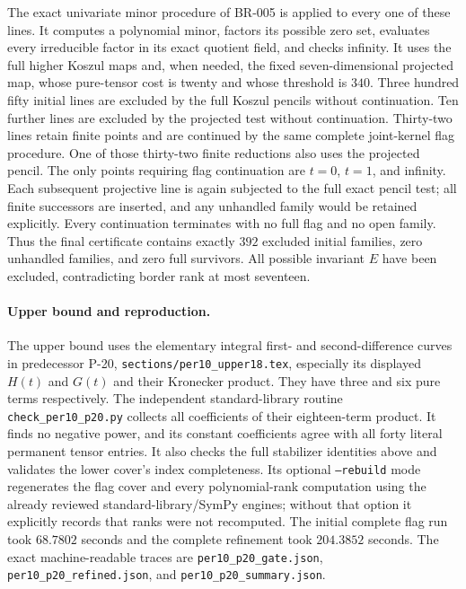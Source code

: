 The exact univariate minor procedure of BR-005 is applied to every
one of these lines.  It computes a polynomial minor, factors its
possible zero set, evaluates every irreducible factor in its exact
quotient field, and checks infinity.  It uses the full higher Koszul
maps and, when needed, the fixed seven-dimensional projected map,
whose pure-tensor cost is twenty and whose threshold is $340$.
Three hundred fifty initial lines are excluded by the full Koszul
pencils without continuation.  Ten further lines are excluded by
the projected test without continuation.  Thirty-two lines retain
finite points and are continued by the same complete joint-kernel
flag procedure.  One of those thirty-two finite reductions also
uses the projected pencil.  The only points requiring flag
continuation are $t=0$, $t=1$, and infinity.  Each subsequent
projective line is again subjected to the full exact pencil test;
all finite successors are inserted, and any unhandled family would
be retained explicitly.  Every continuation terminates with no
full flag and no open family.  Thus the final certificate contains
exactly $392$ excluded initial families, zero unhandled families,
and zero full survivors.  All possible invariant $E$ have been
excluded, contradicting border rank at most seventeen.

\paragraph{Upper bound and reproduction.}
The upper bound uses the elementary integral first- and second-difference
curves in predecessor P-20, \texttt{sections/per10\_upper18.tex},
especially its displayed $H(t)$ and $G(t)$ and their Kronecker product.
They have three and six pure terms respectively.  The independent
standard-library routine \texttt{check\_per10\_p20.py} collects all
coefficients of their eighteen-term product.  It finds no negative
power, and its constant coefficients agree with all forty literal
permanent tensor entries.  It also checks the full stabilizer
identities above and validates the lower cover's index completeness.
Its optional \texttt{--rebuild} mode regenerates the flag cover and
every polynomial-rank computation using the already reviewed
standard-library/SymPy engines; without that option it explicitly
records that ranks were not recomputed.  The initial complete flag
run took $68.7802$ seconds and the complete refinement took
$204.3852$ seconds.  The exact machine-readable traces are
\texttt{per10\_p20\_gate.json}, \texttt{per10\_p20\_refined.json},
and \texttt{per10\_p20\_summary.json}.

